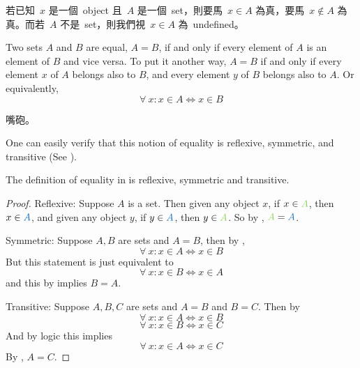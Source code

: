 \begin{note}
若已知\ \(x\) 是一個\ object 且\ \(A\) 是一個\ set，則要馬\ \(x \in A\) 為真，要馬\ \(x \notin A\) 為真。而若\ \(A\) 不是\ set，則我們視\ \(x \in A\) 為\ undefined。
\end{note}

\begin{definition} \label{def 3.1.4} 
Two sets \(A\) and \(B\) are equal, \(A = B\), if and only if every element of \(A\) is an element of \(B\) and vice versa. To put it another way, \(A = B\) if and only if every element \(x\) of \(A\) belongs also to \(B\), and every element \(y\) of \(B\) belongs also to \(A\). Or equivalently,
\[
  \forall\ x : x \in A \iff x \in B
\]
\end{definition}

\begin{example}
嘴砲。
\end{example}

\begin{note}
One can easily verify that this notion of equality is reflexive, symmetric, and transitive (See ).
\end{note}

\begin{additional corollary}\label{ac 3.1.1}
The definition of equality in  is reflexive, symmetric and transitive.
\end{additional corollary}

\begin{proof}

Reflexive: Suppose \(A\) is a set. Then given any object \(x\), if \(x \in \GREEN{A}\), then \(x \in \BLUE{A}\), and given any object \(y\), if \(y \in \BLUE{A}\), then \(y \in \GREEN{A}\). So by , \(\GREEN{A} = \BLUE{A}\).

Symmetric: Suppose \(A, B\) are sets and \(A = B\), then by ,
\[
  \forall\ x : x \in A \iff x \in B
\]
But this statement is just equivalent to
\[
  \forall\ x : x \in B \iff x \in A
\]
and this by  implies \(B = A\).

Transitive: Suppose \(A, B, C\) are sets and \(A = B\) and \(B = C\). Then by 
\[
  \forall\ x : x \in A \iff x \in B
\]
\[
  \forall\ x : x \in B \iff x \in C
\]
And by logic this implies
\[
  \forall\ x : x \in A \iff x \in C
\]
By , \(A = C\).
\end{proof}

